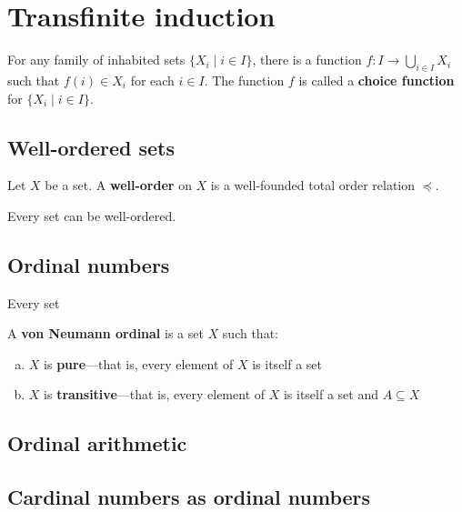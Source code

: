 \section{Transfinite induction}
\label{secTransfiniteInduction}

\todo{}

\begin{axiom}
\label{axAxiomOfChoice}
For any family of inhabited sets $\{ X_i \mid i \in I \}$, there is a function $f : I \to \bigcup_{i \in I} X_i$ such that $f(i) \in X_i$ for each $i \in I$. The function $f$ is called a \textbf{choice function} for $\{ X_i \mid i \in I \}$.
\end{axiom}

\todo{}

\subsection*{Well-ordered sets}

\begin{definition}
\label{defWellOrder}
Let $X$ be a set. A \textbf{well-order} on $X$ is a well-founded total order relation $\preceq$.
\end{definition}

\begin{theoremac}
Every set can be well-ordered.
\end{theoremac}

\begin{cproof}
\todo{}
\end{cproof}

\todo{}

\subsection*{Ordinal numbers}

\todo{}

\begin{axiom}
\label{axFoundation}
Every set   
\end{axiom}

\todo{}

\begin{definition}
\label{defVonNeumannOrdinal}
A \textbf{von Neumann ordinal} is a set $X$ such that:
\begin{enumerate}[(a)]
\item $X$ is \textbf{pure}---that is, every element of $X$ is itself a set
\item $X$ is \textbf{transitive}---that is, every element of $X$ is itself a set and $A \subseteq X$ 
\end{enumerate}
\end{definition}

\todo{}

\subsection*{Ordinal arithmetic}

\todo{}

\subsection*{Cardinal numbers as ordinal numbers}

\todo{}

\begin{definition}

\end{definition}